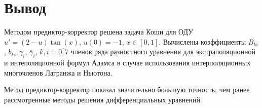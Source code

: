 \documentclass[
11pt,
master, %
subf, %
href, %
colorlinks=true, %
times, %
]{disser}
\begin{document}
\newpage
\section{Вывод}
Методом предиктор-корректор решена задача Коши для ОДУ $u' = (2-u)\tan(x)$, $u(0) = -1$, $x\in [0,1]$. Вычислены коэффициенты $B_{ki}$, $b_{ki}, \gamma_i$, $\overline{\gamma}_i$, $k,i = \overline{0,7}$ членов ряда разностного уравнения для экстраполяционной и интеполяционной формул Адамса в случае использования интерполяционных многочленов Лагранжа и Ньютона.

Метод предиктор-корректор показал значительно большую точность, чем ранее рассмотренные методы решения дифференциальных уравнений.
\end{document}
